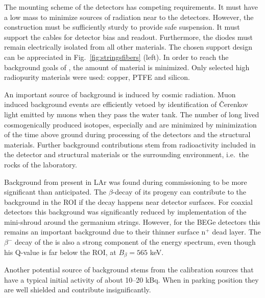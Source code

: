 The mounting scheme of the detectors has competing requirements. It must have a low mass to minimize sources of radiation near to the detectors. However, the construction must be sufficiently sturdy to provide safe suspension. It must support the cables for detector bias and readout. Furthermore, the diodes must remain electrically isolated from all other materials. The chosen support design can be appreciated in Fig.~\ref{fig:stringsfibers} (left). In order to reach the background goals of {\gerda}, the amount of material is minimized. Only selected high radiopurity materials were used: copper, PTFE and silicon.

 An important source of background is induced by cosmic radiation. Muon induced background events are efficiently vetoed by identification of Čerenkov light emitted by muons when they pass the water tank. The number of long lived cosmogenically produced isotopes, especially  and  are minimized by minimization of the time above ground during processing of the detectors and the structural materials. Further background contributions stem from radioactivity included in the detector and structural materials or the surrounding environment, i.e.~the rocks of the laboratory.

Background from  present in LAr was found during {\gerda} commissioning to be more significant than anticipated. The $\beta$-decay of its progeny  can contribute to the background in the ROI if the decay happens near detector surfaces. For coaxial detectors this background was significantly reduced by implementation of the mini-shroud around the germanium strings. However, for the BEGe detectors this remains an important background due to their thinner surface n$^+$ dead layer. The $\beta^-$ decay of the  is also a strong component of the energy spectrum, even though his Q-value is far below the ROI, at $B_\beta=565$ keV.

Another potential source of background stems from the calibration sources that have a typical initial activity of about 10–20 kBq. When in parking position they are well shielded and contribute insignificantly.

